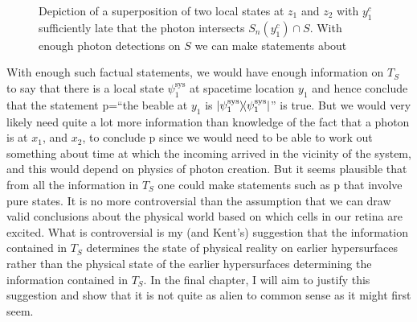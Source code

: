 \begin{figure}[ht!]

\vspace*{2px}
\caption{Depiction of a superposition of two local states at $z_1$ and $z_2$ with $y^c_1$ sufficiently late that the photon intersects $S_n(y^c_1)\cap S$. With enough photon detections on $S$ we can make statements about }
\label{kentdecoh5}
\end{figure}


 With enough such factual statements, we would have enough information on $T_S$ to say that there is a local state $\psi_1^\text{sys}$ at spacetime location $y_1$ and hence conclude that the statement p=``the beable at $y_1$ is $\dyad{\psi_1^\text{sys}}$'' is true. But we would very likely need quite a lot more information than knowledge of the fact that a photon is at $x_1$, and $x_2$, to conclude p since we would need to be able to work out something about time at which the incoming arrived in the vicinity of the system, and this would depend on physics of photon creation. But it seems plausible that from all the information in $T_S$ one could make statements such as p that involve pure states. It is no more controversial than the assumption that we can draw valid conclusions about the physical world based on which cells in our retina are excited. What is controversial is my (and Kent's) suggestion   that the information contained in $T_S$ determines the state of physical reality on earlier hypersurfaces rather than the physical state of the earlier hypersurfaces determining the information contained in $T_S$. In the final chapter, I will aim to justify this suggestion and show that it is not quite as alien to common sense as it might first seem. 
 
